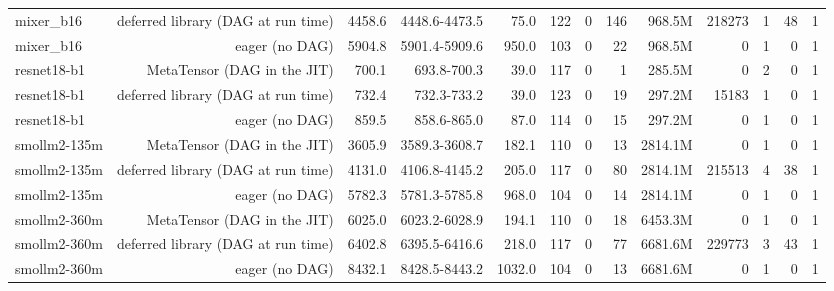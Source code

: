 \begin{tabular}{lrrrrrrrrrrrr}
mixer\_b16 & deferred library (DAG at run time) & 4458.6 & 4448.6-4473.5 & 75.0 & 122 & 0 & 146 & 968.5M & 218273 & 1 & 48 & 1 \\
mixer\_b16 & eager (no DAG) & 5904.8 & 5901.4-5909.6 & 950.0 & 103 & 0 & 22 & 968.5M & 0 & 1 & 0 & 1 \\
resnet18-b1 & MetaTensor (DAG in the JIT) & 700.1 & 693.8-700.3 & 39.0 & 117 & 0 & 1 & 285.5M & 0 & 2 & 0 & 1 \\
resnet18-b1 & deferred library (DAG at run time) & 732.4 & 732.3-733.2 & 39.0 & 123 & 0 & 19 & 297.2M & 15183 & 1 & 0 & 1 \\
resnet18-b1 & eager (no DAG) & 859.5 & 858.6-865.0 & 87.0 & 114 & 0 & 15 & 297.2M & 0 & 1 & 0 & 1 \\
smollm2-135m & MetaTensor (DAG in the JIT) & 3605.9 & 3589.3-3608.7 & 182.1 & 110 & 0 & 13 & 2814.1M & 0 & 1 & 0 & 1 \\
smollm2-135m & deferred library (DAG at run time) & 4131.0 & 4106.8-4145.2 & 205.0 & 117 & 0 & 80 & 2814.1M & 215513 & 4 & 38 & 1 \\
smollm2-135m & eager (no DAG) & 5782.3 & 5781.3-5785.8 & 968.0 & 104 & 0 & 14 & 2814.1M & 0 & 1 & 0 & 1 \\
smollm2-360m & MetaTensor (DAG in the JIT) & 6025.0 & 6023.2-6028.9 & 194.1 & 110 & 0 & 18 & 6453.3M & 0 & 1 & 0 & 1 \\
smollm2-360m & deferred library (DAG at run time) & 6402.8 & 6395.5-6416.6 & 218.0 & 117 & 0 & 77 & 6681.6M & 229773 & 3 & 43 & 1 \\
smollm2-360m & eager (no DAG) & 8432.1 & 8428.5-8443.2 & 1032.0 & 104 & 0 & 13 & 6681.6M & 0 & 1 & 0 & 1 \\
\bottomrule
\end{tabular}
